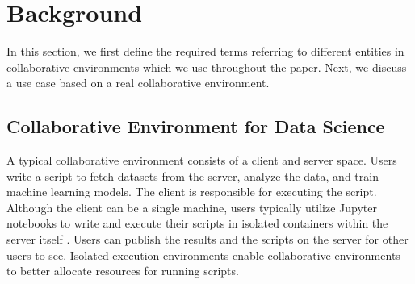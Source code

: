\section{Background} \label{sec-background}
In this section, we first define the required terms referring to different entities in collaborative environments which we use throughout the paper.
Next, we discuss a use case based on a real collaborative environment.

\subsection{Collaborative Environment for Data Science}
A typical collaborative environment consists of a client and server space.
Users write a script to fetch datasets from the server, analyze the data, and train machine learning models.
The client is responsible for executing the script.
Although the client can be a single machine, users typically utilize Jupyter notebooks  \cite{Kluyver:2016aa} to write and execute their scripts in isolated containers \cite{merkel2014docker} within the server itself \cite{kagglewebsite, googlecolab, netflix-notebook}.
Users can publish the results and the scripts on the server for other users to see.
Isolated execution environments enable collaborative environments to better allocate resources for running scripts.

